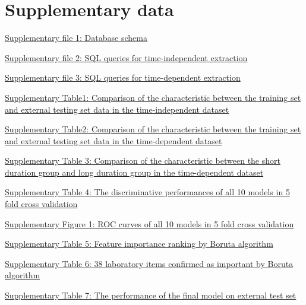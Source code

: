 \documentclass[final,3p,times,authoryear]{elsarticle}
\begin{document}
\appendix
\section{Supplementary data}\label{sec:supplementary}
\href{run:supplementary/DBschema.dbml}{Supplementary file 1: Database schema}
\label{file:DBschema}

\href{run:data.sql}{Supplementary file 2: SQL queries for time-independent extraction}
\label{file:sql}

\href{run:data_time.sql}{Supplementary file 3: SQL queries for time-dependent extraction}
\label{file:sql_time}

\href{run:supplementary/latex_data_description_table_train_test_origi.csv}{Supplementary Table1: Comparison of the characteristic between the training set and external testing set data in the time-independent dataset}
\label{tab:train_test_origi}

\href{run:supplementary/latex_data_description_table_train_test_time.cdv}{Supplementary Table2: Comparison of the characteristic between the training set and external testing set data in the time-dependent dataset}
\label{tab:train_test_time}

\href{run:supplementary/latex_data_description_table_outcome_time.csv}{Supplementary Table 3: Comparison of the characteristic between the short duration group and long duration group in the time-dependent dataset}
\label{tab:good_outcome_poor_outcome_time}


\href{run:supplementary/kfolint_results.csv}{Supplementary Table 4: The discriminative performances of all 10 models in 5 fold cross validation}
\label{tab:kfold_results}

\href{run:supplementary/kfoldall.png}{Supplementary Figure 1: ROC curves of all 10 models in 5 fold cross validation}
\label{fig:kfold_all}

\href{run:supplementary/ranking_df.csv}{Supplementary Table 5: Feature importance ranking by Boruta algorithm}
\label{tab:boruta_ranking_df}

\href{run:supplementary/top38_confirmed_vars.csv}{Supplementary Table 6: 38 laboratory items confirmed as important by Boruta algorithm}
\label{tab:boruta_confirmed_vars}

\href{run:supplementary/extval_result.csv}{Supplementary Table 7: The performance of the final model on external test set}
\label{tab:extval_result}
\end{document}

